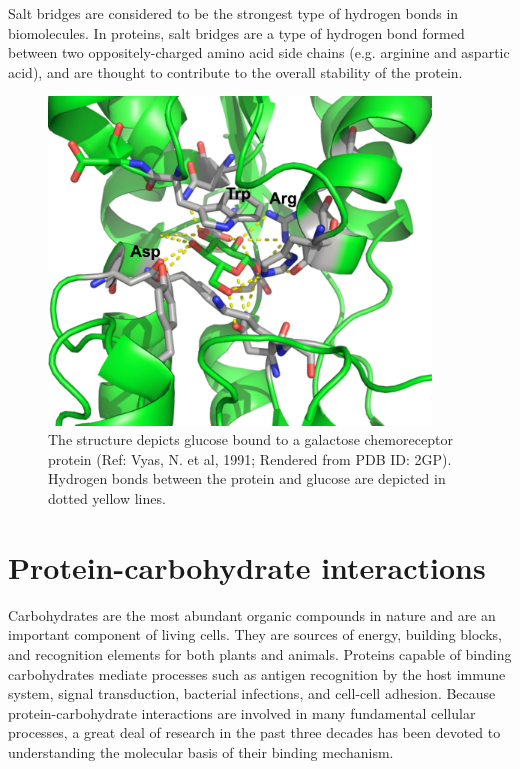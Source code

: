 Salt bridges are considered to be the strongest type of hydrogen bonds in biomolecules.  In proteins, salt bridges are a type of hydrogen bond formed between two oppositely-charged amino acid side chains (e.g. arginine and aspartic acid), and are thought to contribute to the overall stability of the protein.\cite{Nakamura:1996vm,Pace:2000eg}

\begin{figure}
 \centering
 \includegraphics[width=4in]{figures/introduction/sugar_protein_binding.pdf}
 \caption[An example of sugar-lectin binding]{The structure depicts glucose bound to a galactose chemoreceptor protein (Ref: Vyas, N. et al, 1991; Rendered from PDB ID: 2GP). Hydrogen bonds between the protein and glucose are depicted in dotted yellow lines. }
 \label{fig:sugar_protein}
\end{figure}

\section{Protein-carbohydrate interactions}
Carbohydrates are the most abundant organic compounds in nature and are an important component of living cells.  They are sources of energy, building blocks, and recognition elements for both plants and animals.  Proteins capable of binding carbohydrates mediate processes such as antigen recognition by the host immune system,\cite{vanRozendaal:2000fi,Reid:1998tw} signal transduction,\cite{Rudd:2001te} bacterial infections,\cite{Karlsson:1999ta} and cell-cell adhesion.\cite{Rogers:1983wp} 
Because protein-carbohydrate interactions are involved in many fundamental cellular processes, a great deal of research in the past three decades has been devoted to understanding the molecular basis of their binding mechanism. 

